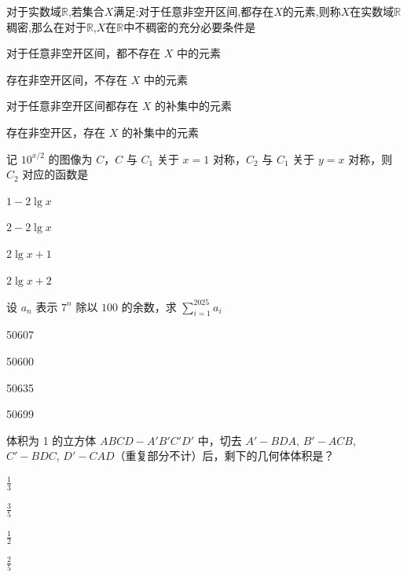 \documentclass{exam-zh}
\begin{document}
\begin{question}
对于实数域$\mathbb R$,若集合$X$满足:对于任意非空开区间,都存在$X$的元素,则称$X$在实数域$\mathbb R$稠密,那么在对于$\mathbb R$,$X$在$\mathbb R$中不稠密的充分必要条件是 \paren[]
\begin{choices}
  \item 对于任意非空开区间，都不存在 $X$ 中的元素
  \item 存在非空开区间，不存在 $X$ 中的元素
  \item 对于任意非空开区间都存在 $X$ 的补集中的元素
  \item 存在非空开区，存在 $X$ 的补集中的元素
\end{choices}
\end{question}

\begin{question}
记 $10^{x/2}$ 的图像为 $C$，$C$ 与 $C_1$ 关于 $x=1$ 对称，$C_2$ 与 $C_1$ 关于 $y=x$ 对称，则 $C_2$ 对应的函数是 \paren[]
\begin{choices}
  \item $1-2\lg x$
  \item $2-2\lg x$
  \item $2\lg x+1$
  \item $2\lg x+2$
\end{choices}
\end{question}

\begin{question}
设 $a_n$ 表示 $7^n$ 除以 $100$ 的余数，求 $\sum_{i=1}^{2025} a_i$ \paren[]
\begin{choices}
  \item 50607
  \item 50600
  \item 50635
  \item 50699
\end{choices}
\end{question}

\begin{question}
体积为 1 的立方体 $ABCD-A'B'C'D'$ 中，切去 $A'-BDA$, $B'-ACB$, $C'-BDC$, $D'-CAD$（重复部分不计）后，剩下的几何体体积是？ \paren[]
\begin{choices}
  \item $\frac{1}{3}$
  \item $\frac{3}{5}$
  \item $\frac{1}{2}$
  \item $\frac{2}{5}$
\end{choices}
\end{question}
\end{document}
